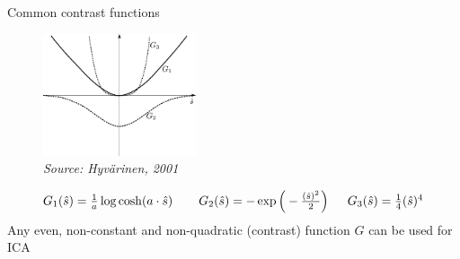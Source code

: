 \clearpage
\begin{frame}{Common contrast functions}
 
 \begin{figure}
 	\centering
 	\includegraphics[width=4.5cm]{./img/contrast_functions.pdf}
    \vspace{-0.5cm}
 	\caption*{\hspace{5cm}\textit{\tiny{Source: Hyv\"arinen, 2001}}}
 \end{figure}
 
 \begin{equation*}
 	\smaller
 \begin{array}{lll}
 	G_1(\hat{s}) = \frac{1}{a} \log \cosh (a \cdot \hat{s}) 
 	\;\;& \;\;G_2(\hat{s}) = -\exp \Big( -\frac{(\hat{s})^2}{2} \Big)
 	& \;\;G_3(\hat{s}) = \frac{1}{4} (\hat{s})^4
	\end{array}
 \end{equation*}
 Any even, non-constant and non-quadratic (contrast) function $G$ can be used for ICA
 
 
 \end{frame}

